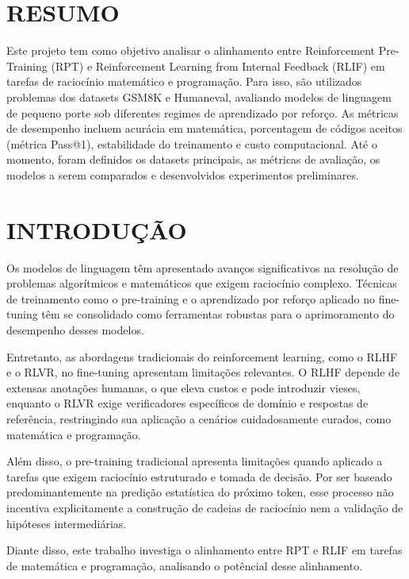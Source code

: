 \documentclass[11pt,a4paper]{article}
\begin{document}
\section{RESUMO}

Este projeto tem como objetivo analisar o alinhamento entre Reinforcement Pre-Training (RPT) e Reinforcement Learning from Internal Feedback (RLIF) em tarefas de raciocínio matemático e programação. Para isso, são utilizados problemas dos datasets GSM8K e Humaneval, avaliando modelos de linguagem de pequeno porte sob diferentes regimes de aprendizado por reforço. As métricas de desempenho incluem acurácia em matemática, porcentagem de códigos aceitos (métrica Pass@1), estabilidade do treinamento e custo computacional. Até o momento, foram definidos os datasets principais, as métricas de avaliação, os modelos a serem comparados e desenvolvidos experimentos preliminares.


\section{INTRODUÇÃO}

Os modelos de linguagem têm apresentado avanços significativos na resolução de problemas algorítmicos e matemáticos que exigem raciocínio complexo. Técnicas de treinamento como o pre-training e o aprendizado por reforço aplicado no fine-tuning têm se consolidado como ferramentas robustas para o aprimoramento do desempenho desses modelos.

Entretanto, as abordagens tradicionais do reinforcement learning, como o RLHF e o RLVR, no fine-tuning apresentam limitações relevantes. O RLHF depende de extensas anotações humanas, o que eleva custos e pode introduzir vieses, enquanto o RLVR exige verificadores específicos de domínio e respostas de referência, restringindo sua aplicação a cenários cuidadosamente curados, como matemática e programação.

Além disso, o pre-training tradicional apresenta limitações quando aplicado a tarefas que exigem raciocínio estruturado e tomada de decisão. Por ser baseado predominantemente na predição estatística do próximo token, esse processo não incentiva explicitamente a construção de cadeias de raciocínio nem a validação de hipóteses intermediárias.

Diante disso, este trabalho investiga o alinhamento entre RPT e RLIF em tarefas de matemática e programação, analisando o potêncial desse alinhamento.
\end{document}
